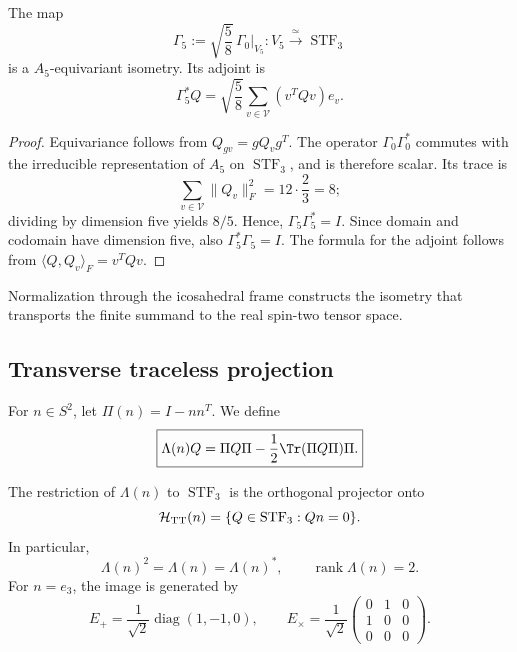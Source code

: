 \begin{theorem}
\label{ii:ii:pent:thm:gravity-gamma5}
The map
\begin{equation}
\label{ii:ii:pent:eq:gravity-gamma5}
\boxed{
\Gamma_5:=\sqrt{\frac58}\,\Gamma_0|_{V_5}:
V_5\xrightarrow{\ \simeq\ }\operatorname{STF}_3}
\end{equation}
is a \(A_5\)-equivariant isometry. Its adjoint is
\begin{equation}
\label{ii:ii:pent:eq:gravity-gamma5-adjoint}
\Gamma_5^*Q=\sqrt{\frac58}
\sum_{v\in\mathcal V}(v^TQv)e_v.
\end{equation}
\end{theorem}

\begin{proof}
Equivariance follows from \(Q_{gv}=gQ_vg^T\). The operator
\(\Gamma_0\Gamma_0^*\) commutes with the irreducible representation of
\(A_5\) on \(\operatorname{STF}_3\), and is therefore scalar. Its trace
is
\[
\sum_{v\in\mathcal V}\|Q_v\|_F^2
=12\cdot\frac23=8;
\]
dividing by dimension five yields \(8/5\). Hence,
\(\Gamma_5\Gamma_5^*=I\). Since domain and codomain have dimension
five, also \(\Gamma_5^*\Gamma_5=I\). The formula for the adjoint
follows from \(\langle Q,Q_v\rangle_F=v^TQv\).
\end{proof}

Normalization through the icosahedral frame constructs the isometry that
transports the finite summand to the real spin-two tensor space.

\subsection{Transverse traceless projection}

For \(n\in S^2\), let \(\Pi(n)=I-nn^T\). We define
\begin{equation}
\label{ii:ii:pent:eq:gravity-lambda-tt}
\boxed{
\Lambda(n)Q
=\Pi Q\Pi-\frac12\Tr(\Pi Q\Pi)\Pi.}
\end{equation}

\begin{theorem}
\label{ii:ii:pent:thm:gravity-tt}
The restriction of \(\Lambda(n)\) to \(\operatorname{STF}_3\) is the
orthogonal projector onto
\begin{equation}
\label{ii:ii:pent:eq:gravity-htt}
\mathcal H_{\rm TT}(n)
=\{Q\in\operatorname{STF}_3:Qn=0\}.
\end{equation}
In particular,
\begin{equation}
\label{ii:ii:pent:eq:gravity-lambda-properties}
\Lambda(n)^2=\Lambda(n)=\Lambda(n)^*,
\qquad \operatorname{rank}\Lambda(n)=2.
\end{equation}
For \(n=e_3\), the image is generated by
\begin{equation}
\label{ii:ii:pent:eq:gravity-plus-cross}
E_+=\frac1{\sqrt2}\operatorname{diag}(1,-1,0),
\qquad
E_\times=\frac1{\sqrt2}
\begin{pmatrix}0&1&0\\1&0&0\\0&0&0\end{pmatrix}.
\end{equation}
\end{theorem}

